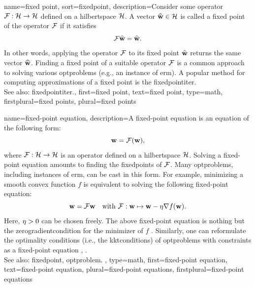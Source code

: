 {name={fixed point},
sort={fixedpoint},
	description={Consider some \gls{operator} $\mathcal{F}: \mathcal{H} \rightarrow \mathcal{H}$ 
		defined on a \gls{hilbertspace} $\mathcal{H}$. A 
		\gls{vector} $\widehat{{\bf w}} \in \mathcal{H}$ 
		is called a fixed point of the \gls{operator} $\mathcal{F}$ 
		if it satisfies
		\[
			\mathcal{F} \widehat{{\bf w}} = \widehat{{\bf w}}.
		\]
		In other words, applying the \gls{operator} $\mathcal{F}$ to its fixed 
		point $\widehat{{\bf w}}$ returns the same \gls{vector} $\widehat{{\bf w}}$. 
		Finding a fixed point of a suitable \gls{operator} $\mathcal{F}$ is a common 
		approach to solving various \glspl{optproblem} (e.g., an instance of \gls{erm}). 
		A popular method for computing approximations of a fixed point is the \gls{fixedpointiter}.
		\\
		See also: \gls{fixedpointiter}.},
	first={fixed point},
	text={fixed point},
	type=math, 
	firstplural={fixed points}, 
	plural={fixed points}
}

{name={fixed-point equation},
	description={A fixed-point equation is an equation of the following form:
		\[
		{\bf w} = \mathcal{F}({\bf w}),
		\]
		where $\mathcal{F}:\mathcal{H} \to \mathcal{H}$ is an \gls{operator} defined 
		on a \gls{hilbertspace} $\mathcal{H}$.  
		Solving a fixed-point equation amounts to finding the \glspl{fixedpoint} of 
		$\mathcal{F}$. Many \glspl{optproblem}, including instances of \gls{erm}, 
		can be cast in this form. For example, minimizing a \gls{smooth} \gls{convex} 
		\gls{function} $f$ is equivalent to solving the following fixed-point equation:
		$${\bf w} = \mathcal{F} {\bf w} \quad \mbox{with }  
		\mathcal{F}: {\bf w} \mapsto {\bf w} - \eta \nabla f({\bf w}).$$
		Here, $\eta>0$ can be chosen freely. The above fixed-point 
		equation is nothing but the \gls{zerogradientcondition} for the 
		minimizer of $f$ \cite{BoydConvexBook}. Similarly, one can reformulate the
		optimality conditions (i.e., the \gls{kktconditions}) of \glspl{optproblem} with constraints as a 
		fixed-point equation \cite{BoydConvexBook}, \cite{pock_chambolle_2016}.
		\\
		See also: \gls{fixedpoint}, \gls{optproblem}. }, 
	type=math, 
	first={fixed-point equation},
 	text={fixed-point equation}, 
	plural={fixed-point equations}, 
	firstplural={fixed-point equations}
}

